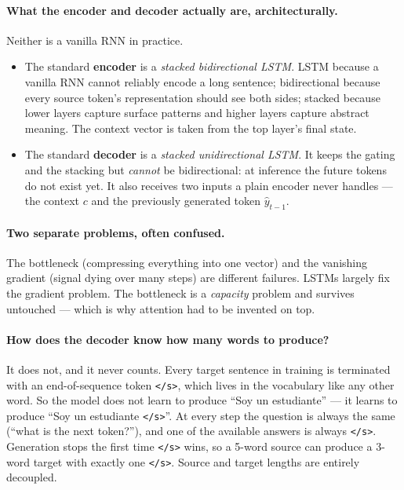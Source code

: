 \documentclass[11pt,a4paper]{article}
\begin{document}
\paragraph{What the encoder and decoder actually are, architecturally.} Neither is a vanilla
RNN in practice.
\begin{itemize}
\item The standard \textbf{encoder} is a \emph{stacked bidirectional LSTM}. LSTM because a
  vanilla RNN cannot reliably encode a long sentence; bidirectional because every source
  token's representation should see both sides; stacked because lower layers capture surface
  patterns and higher layers capture abstract meaning. The context vector is taken from the
  top layer's final state.
\item The standard \textbf{decoder} is a \emph{stacked unidirectional LSTM}. It keeps the
  gating and the stacking but \emph{cannot} be bidirectional: at inference the future tokens
  do not exist yet. It also receives two inputs a plain encoder never handles --- the context
  $c$ and the previously generated token $\hat{y}_{t-1}$.
\end{itemize}

\paragraph{Two separate problems, often confused.} The bottleneck (compressing everything
into one vector) and the vanishing gradient (signal dying over many steps) are different
failures. LSTMs largely fix the gradient problem. The bottleneck is a \emph{capacity} problem
and survives untouched --- which is why attention had to be invented on top.

\paragraph{How does the decoder know how many words to produce?} It does not, and it never
counts. Every target sentence in training is terminated with an end-of-sequence token
\texttt{</s>}, which lives in the vocabulary like any other word. So the model does not learn
to produce ``Soy un estudiante'' --- it learns to produce ``Soy un estudiante \texttt{</s>}''.
At every step the question is always the same (``what is the next token?''), and one of the
available answers is always \texttt{</s>}. Generation stops the first time \texttt{</s>} wins,
so a 5-word source can produce a 3-word target with exactly one \texttt{</s>}. Source and
target lengths are entirely decoupled.
\end{document}
